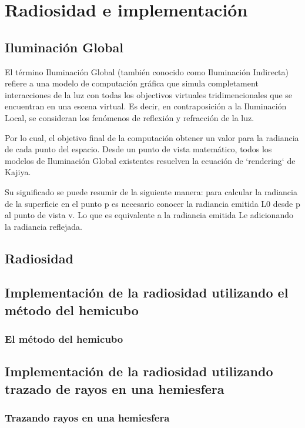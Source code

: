 \chapter{Radiosidad e implementación}
\label{ch:chap02}

\section{Iluminación Global}
\label{sec:ilumglobal}

El término Iluminación Global (también conocido como Iluminación Indirecta) refiere a una modelo de
computación gráfica que simula completament interacciones de la luz con todas los objectivos virtuales tridimencionales
que se encuentran en una escena virtual. Es decir, en contraposición a la Iluminación Local, se consideran los fenómenos de
reflexión y refracción de la luz.

Por lo cual, el objetivo final de la computación obtener un valor para la radiancia de cada punto del espacio. Desde un punto de vista
matemático, todos los modelos de Iluminación Global existentes resuelven la ecuación de `rendering` de Kajiya.

Su significado se puede resumir de la siguiente manera: para calcular la radiancia de la superficie en el punto p es necesario conocer
la radiancia emitida L0 desde p al punto de vista v. Lo que es equivalente a la radiancia emitida Le adicionando la radiancia
reflejada. 

\section{Radiosidad}
\label{sec:radiosidad}

\section{Implementación de la radiosidad utilizando el método del hemicubo}
\label{sec:hemicubo}

\subsection{El método del hemicubo}

\section{Implementación de la radiosidad utilizando trazado de rayos en una hemiesfera}
\label{sec:raytracing}

\subsection{Trazando rayos en una hemiesfera}
